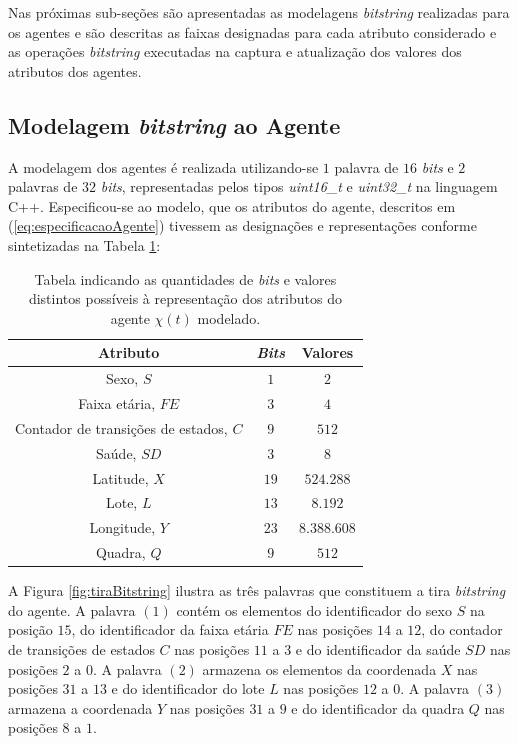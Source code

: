 Nas próximas sub-seções são apresentadas as modelagens \textit{bitstring} realizadas para os agentes e são descritas as faixas designadas para cada atributo considerado e as operações \textit{bitstring} executadas na captura e atualização dos valores dos atributos dos agentes.

\newpage

\subsection{Modelagem \textit{bitstring} ao Agente}

A modelagem dos agentes é realizada utilizando-se $1$ palavra de $16$ \textit{bits} e $2$ palavras de $32$ \textit{bits}, representadas pelos tipos \textit{uint16\_t} e \textit{uint32\_t} na linguagem C++. Especificou-se ao modelo, que os atributos do agente, descritos em (\ref{eq:especificacaoAgente}) tivessem as designações e representações conforme sintetizadas na Tabela \ref{tab:atributosBitstring}:
\begin{table}[H]
\centering
\begin{tabular}{c|c|c}
 \textbf{Atributo} 			& \textbf{\textit{Bits}}	& \textbf{Valores} 	\\ \hline
 Sexo, $S$ 				& $1$				& $2$	  		\\
 Faixa etária, $FE$ 			& $3$				& $4$	  		\\
 Contador de transições de estados, $C$ & $9$				& $512$	  		\\
 Saúde, $SD$	 			& $3$				& $8$	  		\\ 
 Latitude, $X$ 				& $19$				& $524.288$  		\\
 Lote, $L$				& $13$				& $8.192$  		\\
 Longitude, $Y$ 			& $23$				& $8.388.608$ 		\\
 Quadra, $Q$				& $9$				& $512$	  		\\
 \end{tabular}
\caption{Tabela indicando as quantidades de \textit{bits} e valores distintos possíveis à representação dos atributos do agente $\chi(t)$ modelado.}
\label{tab:atributosBitstring}
\end{table}

A Figura \ref{fig:tiraBitstring} ilustra as três palavras que constituem a tira \textit{bitstring} do agente. A palavra $(1)$ contém os elementos do identificador do sexo $S$ na posição $15$, do identificador da faixa etária $FE$ nas posições $14$ a $12$, do contador de transições de estados $C$ nas posições $11$ a $3$ e do identificador da saúde $SD$ nas posições $2$ a $0$. A palavra $(2)$ armazena os elementos da coordenada $X$ nas posições $31$ a $13$ e do identificador do lote $L$ nas posições $12$ a $0$. A palavra $(3)$ armazena a coordenada $Y$ nas posições $31$ a $9$ e do identificador da quadra $Q$ nas posições $8$ a $1$.

